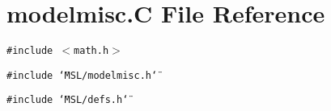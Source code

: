 \section{modelmisc.C File Reference}
\label{modelmisc_8C}
{\tt \#include $<$math.h$>$}\par
{\tt \#include \char`\"{}MSL/modelmisc.h\char`\"{}}\par
{\tt \#include \char`\"{}MSL/defs.h\char`\"{}}\par
